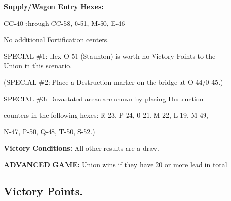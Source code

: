 \begin{scenariodata}
\textbf{Supply/Wagon Entry Hexes:}\\
\end{scenariodata}

\begin{scenariodata}
CC-40 through CC-58, 0-51, M-50, E-46\\
\end{scenariodata}

\begin{scenariodata}
No additional Fortification centers.\\
\end{scenariodata}

\begin{scenariodata}
SPECIAL \#1: Hex O-51 (Staunton) is worth no Victory Points to the\\
Union in this scenario.\\
\end{scenariodata}

\begin{scenariodata}
(SPECIAL \#2: Place a Destruction marker on the bridge at O-44/0-45.)\\
\end{scenariodata}

\begin{scenariodata}
SPECIAL \#3: Devastated areas are shown by placing Destruction\\
\end{scenariodata}

counters in the following hexes: R-23, P-24, 0-21, M-22, L-19, M-49,

\begin{scenariodata}
N-47, P-50, Q-48, T-50, S-52.)\\
\end{scenariodata}

\begin{scenariodata}
\textbf{Victory Conditions:} All other results are a draw.\\
\end{scenariodata}

\begin{scenariodata}
\textbf{ADVANCED GAME:} Union wins if they have 20 or more lead in total\\
\end{scenariodata}

\subsection*{Victory Points.}

